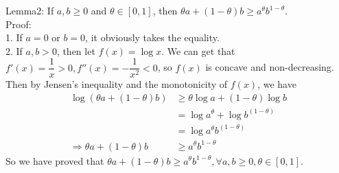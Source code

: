 Lemma2: If $a,b\geq 0$ and $\theta\in[0,1]$, then $\theta a + (1-\theta)b \geq a^{\theta}b^{1-\theta}$. \\
Proof: \\
1. If $a=0$ or $b=0$, it obviously takes the equality. \\
2. If $a,b>0$, then let $f(x)=\log x$. We can get that $f'(x)=\dfrac{1}{x}>0, f''(x)=-\dfrac{1}{x^2}<0$, so $f(x)$ is concave and non-decreasing. \\
Then by Jensen's inequality and the monotonicity of $f(x)$, we have
\begin{align*}
\log\left(\theta a + (1-\theta)b\right) &\geq \theta\log a + (1-\theta)\log b \\
&= \log a^{\theta} + \log b^{(1-\theta)} \\
&= \log a^{\theta}b^{(1-\theta)} \\
\Rightarrow \theta a + (1-\theta)b &\geq a^{\theta}b^{1-\theta}
\end{align*}
So we have proved that $\theta a + (1-\theta)b \geq a^{\theta}b^{1-\theta},\forall a,b\geq 0,\theta\in[0,1]$.


